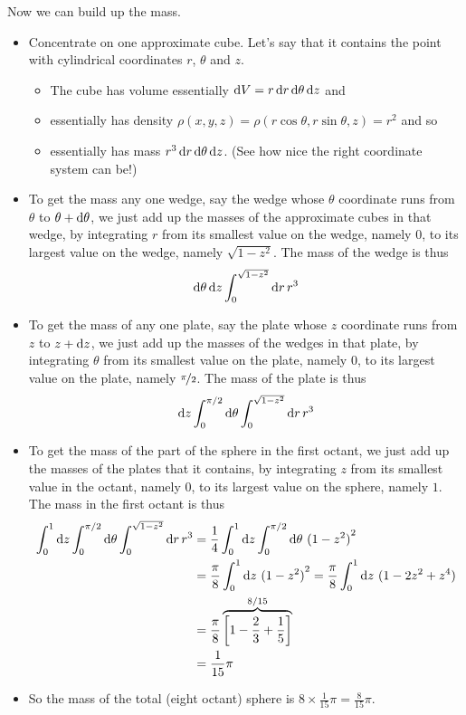 \begin{eg}
Now we can build up the mass.
\begin{itemize}
\item
Concentrate on one approximate cube. Let's say that it contains the point 
with cylindrical coordinates $r$, $\theta$ and $z$.
\begin{itemize}
\item 
The cube has volume essentially $\mathrm{d}V=r\,\mathrm{d}r\,\mathrm{d}\theta\,\mathrm{d}z$
and
\item
essentially has density $\rho(x,y,z)=\rho(r\cos\theta,r\sin\theta,z) = r^2$ 
and so
\item 
essentially has mass $r^3\,\mathrm{d}r\,\mathrm{d}\theta\,\mathrm{d}z$.
(See how nice the right coordinate system can be!)
\end{itemize}

\item
To get the mass any one wedge, say the wedge whose $\theta$ coordinate runs 
from $\theta$ to $\theta+\mathrm{d}\theta$, we just add up the masses of 
the approximate cubes in that wedge, by integrating $r$ from its smallest 
value on the wedge, namely $0$, to its largest value on the wedge, namely 
$\sqrt{1-z^2}$. The mass of the wedge is thus
\begin{align*}
\mathrm{d}\theta\,\mathrm{d}z \int_0^{\sqrt{1-z^2}}  \mathrm{d}r\,r^3
\end{align*}

\item
To get the mass of any one plate, say the plate whose $z$ coordinate runs 
from $z$ to $z+\mathrm{d}z$, we just add up the masses of the wedges 
in that plate, by integrating $\theta$ from its smallest value on 
the plate, namely $0$, to its largest value on the plate, namely 
$\nicefrac{\pi}{2}$. The mass of the plate is thus
\begin{align*}
\mathrm{d}z\int_0^{\pi/2}\mathrm{d}\theta\int_0^{\sqrt{1-z^2}}  \mathrm{d}r\,r^3
\end{align*}

\item
To get the mass of the part of the sphere in the first octant, we just 
add up the masses of the plates that it contains, by integrating $z$ from its smallest value in the octant, namely $0$, to its largest value on the sphere, 
namely  $1$. The mass in the first octant is thus
\begin{align*}
\int_0^1\mathrm{d}z\int_0^{\pi/2}\mathrm{d}\theta\int_0^{\sqrt{1-z^2}}  \mathrm{d}r\,r^3
&= \frac{1}{4}\int_0^1\mathrm{d}z\int_0^{\pi/2}\mathrm{d}\theta\ {(1-z^2)}^2 \\
&= \frac{\pi}{8}\int_0^1\mathrm{d}z\ {(1-z^2)}^2 
 =\frac{\pi}{8}\int_0^1\mathrm{d}z\ (1-2z^2+z^4)  \\
&= \frac{\pi}{8}\overbrace{\left[1-\frac{2}{3}+\frac{1}{5}\right]}^{8/15} \\
&=\frac{1}{15}\pi
\end{align*}
\item
So the mass of the total (eight octant) sphere is $8\times\frac{1}{15}\pi=\frac{8}{15}\pi$.
\end{itemize}


\end{eg}
